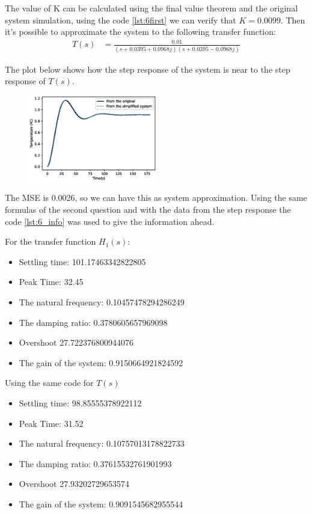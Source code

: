 \documentclass[a4paper]{article}
\begin{document}
The value of K can be calculated using the final value theorem and the original system simulation, using the code \ref{lst:6first} we can verify that $K=0.0099$. Then it's possible to approximate the system to the following transfer function:
\begin{align}
T(s) &=\frac{0.01}{(s+0.0395+0.0968j)(s+0.0395-0.0968j)}
\end{align}

The plot below shows how the step response of the system is near to the step response of $T(s)$.
\begin{figure}[H]
\centering
\includegraphics[width=0.5\textwidth]{Figures/Question6/EXE_6_FINAL_PRINT.eps}
\end{figure}
The MSE is 0.0026, so we can have this as system approximation. Using the same formulas of the second question and with the data from the step response the code \ref{lst:6_info} was used to give the information ahead.
\begin{multicols}{2}
For the transfer function $H_1(s)$:
\begin{itemize}
\item Settling time: 101.17463342822805
\item Peak Time: 32.45
\item The natural frequency:  0.10457478294286249
\item The damping ratio: 0.3780605657969098
\item Overshoot 27.722376800944076
\item The gain of the system:  0.9150664921824592
\end{itemize}
\columnbreak

Using the same code for $T(s)$
\begin{itemize}
\item Settling time: 98.85555378922112
\item Peak Time: 31.52
\item The natural frequency:  0.10757013178822733
\item The damping ratio: 0.37615532761901993
\item Overshoot 27.93202729653574
\item The gain of the system:  0.9091545682955544
\end{itemize}
\end{multicols}
\end{document}
